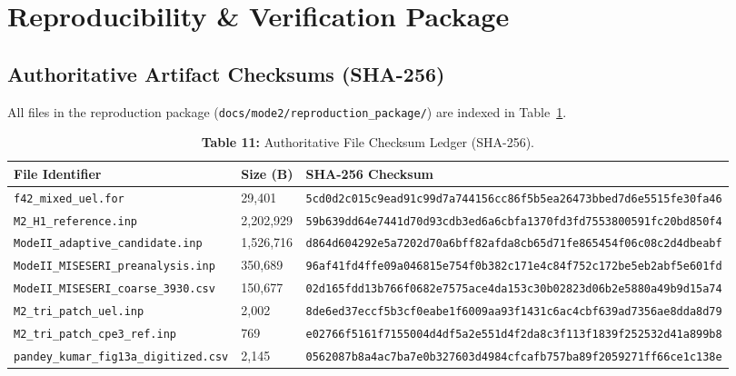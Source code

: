 \documentclass[11pt,a4paper]{article}
\begin{document}
\section{Reproducibility \& Verification Package}

\subsection{Authoritative Artifact Checksums (SHA-256)}
All files in the reproduction package (\texttt{docs/mode2/reproduction\_package/}) are indexed in Table~\ref{tab:hashes}.

\begin{table}[htbp]
\centering
\small
\caption{\textbf{Table 11:} Authoritative File Checksum Ledger (SHA-256).}
\label{tab:hashes}
\begin{tabularx}{\textwidth}{p{4.8cm}p{1.8cm}>{\raggedright\arraybackslash}X}
\toprule
\textbf{File Identifier} & \textbf{Size (B)} & \textbf{SHA-256 Checksum} \\
\midrule
\texttt{f42\_mixed\_uel.for} & 29,401 & {\scriptsize\texttt{5cd0d2c015c9ead91c99d7a744156cc86f5b5ea26473bbed7d6e5515fe30fa46}} \\
\texttt{M2\_H1\_reference.inp} & 2,202,929 & {\scriptsize\texttt{59b639dd64e7441d70d93cdb3ed6a6cbfa1370fd3fd7553800591fc20bd850f4}} \\
\texttt{ModeII\_adaptive\_candidate.inp} & 1,526,716 & {\scriptsize\texttt{d864d604292e5a7202d70a6bff82afda8cb65d71fe865454f06c08c2d4dbeabf}} \\
\texttt{ModeII\_MISESERI\_preanalysis.inp} & 350,689 & {\scriptsize\texttt{96af41fd4ffe09a046815e754f0b382c171e4c84f752c172be5eb2abf5e601fd}} \\
\texttt{ModeII\_MISESERI\_coarse\_3930.csv} & 150,677 & {\scriptsize\texttt{02d165fdd13b766f0682e7575ace4da153c30b02823d06b2e5880a49b9d15a74}} \\
\texttt{M2\_tri\_patch\_uel.inp} & 2,002 & {\scriptsize\texttt{8de6ed37eccf5b3cf0eabe1f6009aa93f1431c6ac4cbf639ad7356ae8dda8d79}} \\
\texttt{M2\_tri\_patch\_cpe3\_ref.inp} & 769 & {\scriptsize\texttt{e02766f5161f7155004d4df5a2e551d4f2da8c3f113f1839f252532d41a899b8}} \\
\texttt{pandey\_kumar\_fig13a\_digitized.csv} & 2,145 & {\scriptsize\texttt{0562087b8a4ac7ba7e0b327603d4984cfcafb757ba89f2059271ff66ce1c138e}} \\
\bottomrule
\end{tabularx}
\end{table}
\end{document}
